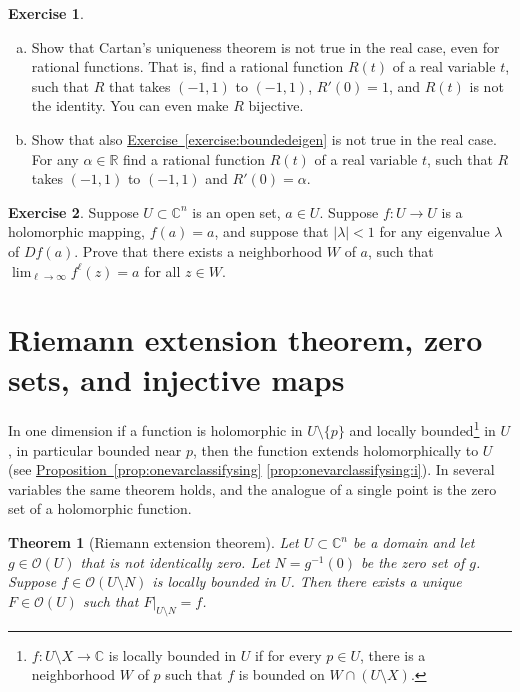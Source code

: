 \documentclass[12pt,openany]{book}
\newcommand{\sabs}[1]{\lvert {#1} \rvert}
\newcommand{\C}{{\mathbb{C}}}
\newcommand{\R}{{\mathbb{R}}}
\newcommand{\sO}{{\mathscr{O}}}
\newcommand{\myindex}[1]{#1\index{#1}}
\theoremstyle{plain}
\newtheorem{thm}{Theorem}[section]
\theoremstyle{remark}
\theoremstyle{definition}
\newenvironment{exbox}{%
    \def\FrameCommand{\vrule width 1pt \relax\hspace {10pt}}%
    \MakeFramed {\advance \hsize -\width \FrameRestore }%
}{%
    \endMakeFramed
}
\newenvironment{exparts}{%
    \leavevmode\begin{enumerate}[a),noitemsep,topsep=0pt,parsep=0pt,partopsep=0pt]
}{%
    \end{enumerate}
}
\theoremstyle{exercise}
\newtheorem{exercise}{Exercise}[section]
\theoremstyle{example}
\newcommand{\exerciseref}[1]{\hyperref[#1]{Exercise~\ref*{#1}}}
\newcommand{\propref}[1]{\hyperref[#1]{Proposition~\ref*{#1}}}
\begin{document}
\begin{exbox}
\begin{exercise}
\begin{exparts}
\item
Show that Cartan's uniqueness theorem is not true in the real case,
even for rational
functions.  That is, find a rational function $R(t)$ of
a real variable $t$, such that $R$ that takes $(-1,1)$ to
$(-1,1)$, $R'(0) = 1$, and $R(t)$ is not the identity.  You can even make
$R$ bijective.
\item
Show that also \exerciseref{exercise:boundedeigen} is not true in the real
case.
For any $\alpha \in \R$ find a rational function $R(t)$ of
a real variable $t$, such that $R$ takes $(-1,1)$ to $(-1,1)$ and
$R'(0) = \alpha$.
\end{exparts}
\end{exercise}

\begin{exercise}
Suppose $U \subset \C^n$ is an open set, $a \in U$.
Suppose $f \colon U \to U$ is a holomorphic mapping,
$f(a) = a$, and suppose that $\sabs{\lambda} < 1$
for any eigenvalue $\lambda$ of
$D f(a)$.  Prove that there exists a neighborhood $W$ of $a$, such that
$\lim_{\ell \to \infty} f^{\ell}(z) = a$ for all $z \in W$.
\end{exercise}
\end{exbox}


\section{Riemann extension theorem, zero sets, and injective maps}

In one dimension if a function is holomorphic in $U
\setminus \{ p \}$ and
locally bounded\footnote{%
$f \colon U \setminus X \to \C$ is locally bounded in $U$
if for every $p \in U$, there is a neighborhood $W$ of
$p$ such that $f$ is bounded on $W \cap (U \setminus X)$.}
in $U$, in particular bounded near
$p$, then the function extends holomorphically to $U$ (see
\propref{prop:onevarclassifysing} \ref{prop:onevarclassifysing:i}).  In several
variables the same theorem holds, and the analogue of a single point
is the zero set of a holomorphic function.

\begin{thm}[\myindex{Riemann extension theorem}]
Let $U \subset \C^n$ be a domain and let $g \in \sO(U)$ that is not
identically zero.  Let
$N = g^{-1}(0)$ be the zero set of $g$.  Suppose 
$f \in \sO(U \setminus N)$ %
is locally bounded in $U$.
Then there exists a unique $F \in \sO(U)$ such that $F|_{U \setminus N} = f$.
\end{thm}
\end{document}

